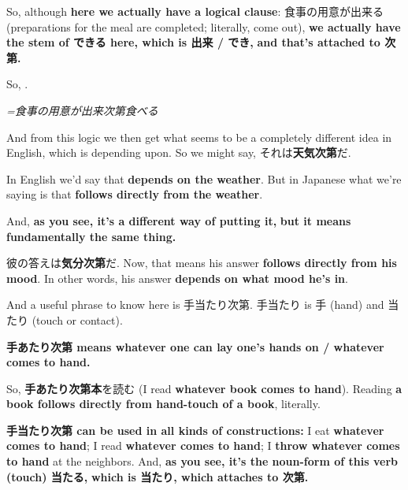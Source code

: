 So, although {\bf here we actually have a logical clause}: 食事の用意が出来る (preparations for the meal are completed; literally, come out), {\bf we actually have the stem of できる here, which is 出来 / でき,} {\bf and that's attached to 次第.}

{}

So, .

{\em =食事の用意が出来次第食べる}

\stopsectionlevel

\startsectionlevel[title={次第 as depending upon},reference={次第-as-depending-upon}]

And from this logic we then get what seems to be a completely different idea in English, which is depending upon. So we might say, それは{\bf 天気次第}だ.

{}

In English we'd say that {\bf depends on the weather}. But in Japanese what we're saying is that {\bf follows directly from the weather}.

And, {\bf as you see, it's a different way of putting it,} {\bf but it means fundamentally the same thing.}

彼の答えは{\bf 気分次第}だ. Now, that means his answer {\bf follows directly from his mood}. In other words, his answer {\bf depends on what mood he's in}.

\startsectionlevel[title={手当たり次第 phrase},reference={手当たり次第-phrase}]

And a useful phrase to know here is 手当たり次第. 手当たり is 手 (hand) and 当たり (touch or contact).

{\bf 手あたり次第 means whatever one can lay one's hands on / whatever comes to hand.}

{}

So, {\bf 手あたり次第本}を読む (I read {\bf whatever book comes to hand}). Reading {\bf a book follows directly from hand-touch of a book}, literally.

\thinrule

{\bf 手当たり次第 can be used in all kinds of constructions:} I eat {\bf whatever comes to hand}; I read {\bf whatever comes to hand}; I {\bf throw whatever comes to hand} at the neighbors. And, {\bf as you see, it's the noun-form of this verb (touch) 当たる,} {\bf which is 当たり, which attaches to 次第.}

